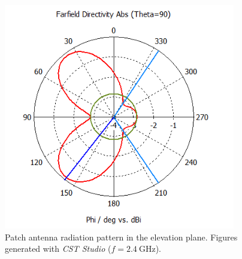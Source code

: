 \begin{figure}[H]
\begin{minipage}{0.45\textwidth}
        \includegraphics[width=0.9\textwidth]{figures/farfield (f=2.4) patch_1.png} %
        \caption{Patch antenna radiation pattern in the elevation plane. Figures generated with \textit{CST Studio} ($f=\SI{2.4}{\giga\hertz}$).}
        \label{fig:patch_2}
    \end{minipage}
\end{figure}

